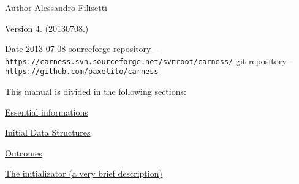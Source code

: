\begin{DoxyAuthor}{Author}
Alessandro Filisetti 
\end{DoxyAuthor}
\begin{DoxyVersion}{Version}
4. (20130708.) 
\end{DoxyVersion}
\begin{DoxyDate}{Date}
2013-\/07-\/08 sourceforge repository -- \href{https://carness.svn.sourceforge.net/svnroot/carness/}{\tt https\-://carness.\-svn.\-sourceforge.\-net/svnroot/carness/} git repository -- \href{https://github.com/paxelito/carness}{\tt https\-://github.\-com/paxelito/carness}
\end{DoxyDate}
This manual is divided in the following sections\-:
\begin{DoxyItemize}
\item \hyperlink{intro}{Essential informations}
\item \hyperlink{pageInitStr}{Initial Data Structures}
\item \hyperlink{pageoutcomes}{Outcomes}
\item \hyperlink{pageInitializator}{The initializator (a very brief description)} 
\end{DoxyItemize}